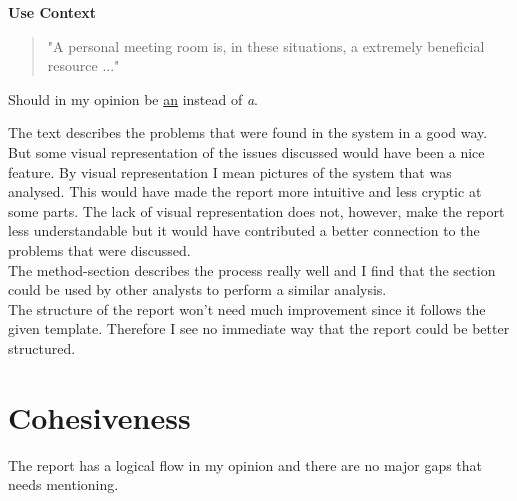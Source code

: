 \documentclass[11pt,a4paper]{article}
\begin{document}
\textbf{Use Context}
\begin{quote}
"A personal meeting room is, in these situations, a extremely beneficial resource ..."
\end{quote}
Should in my opinion be \underline{an} instead of \textit{a}.


The text describes the problems that were found in the system in a good way. But some visual representation of the issues discussed would have been a nice feature. By visual representation I mean pictures of the system that was analysed. This would have made the report more intuitive and less cryptic at some parts. The lack of visual representation does not, however, make the report less understandable but it would have contributed a better connection to the problems that were discussed.\\
The method-section describes the process really well and I find that the section could be used by other analysts to perform a similar analysis.\\ 

The structure of the report won't need much improvement since it follows the given template. Therefore I see no immediate way that the report could be better structured. 

\section{Cohesiveness}
The report has a logical flow in my opinion and there are no major gaps that needs mentioning.
\end{document}
